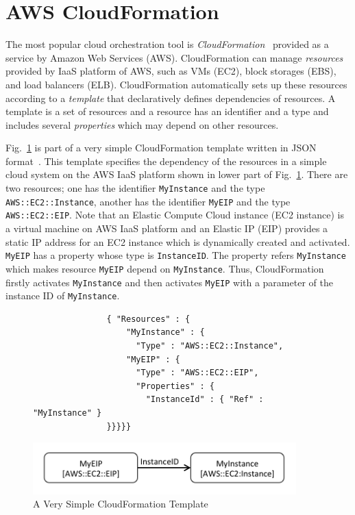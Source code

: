 \documentclass[12pt]{report}
\begin{document}
\section{AWS CloudFormation}
\label{sec:aws}
The most popular cloud orchestration tool is {\it
  CloudFormation}~\cite{CloudFormation} provided as a service by
Amazon Web Services (AWS). CloudFormation can manage {\it resources}
provided by IaaS platform of AWS, such as VMs (EC2), block storages
(EBS), and load balancers (ELB).  CloudFormation automatically sets up
these resources according to a {\it template} that declaratively
defines dependencies of resources.  A template is a set of resources
and a resource has an identifier and a type and includes several {\it
  properties} which may depend on other resources.

Fig.~\ref{fig:AWSExample} is part of a very simple CloudFormation
template written in JSON format~\cite{JSON}.  This template specifies
the dependency of the resources in a simple cloud system on the AWS
IaaS platform shown in lower part of Fig.~\ref{fig:AWSExample}.  There are two
resources; one has the identifier {\tt MyInstance} and the type {\tt
  AWS::EC2::Instance}, another has the identifier {\tt MyEIP} and the
type {\tt AWS::EC2::EIP}. Note that an Elastic Compute Cloud instance
(EC2 instance) is a virtual machine on AWS IaaS platform and an
Elastic IP (EIP) provides a static IP address for an EC2 instance
which is dynamically created and activated. {\tt MyEIP} has a property
whose type is {\tt InstanceID}. The property refers {\tt MyInstance}
which makes resource {\tt MyEIP} depend on {\tt MyInstance}. Thus,
CloudFormation firstly activates {\tt MyInstance} and then activates
{\tt MyEIP} with a parameter of the instance ID of {\tt MyInstance}.
\begin{figure}
\small
\begin{verbatim}
               { "Resources" : {
                   "MyInstance" : {
                     "Type" : "AWS::EC2::Instance",
                   "MyEIP" : {
                     "Type" : "AWS::EC2::EIP",
                     "Properties" : {
                       "InstanceId" : { "Ref" : "MyInstance" }
               }}}}}
\end{verbatim}
\normalsize
\centering
\includegraphics[height=2cm,natwidth=396,natheight=78]{./exaws.png}
\vspace{-0.3cm}
\caption{A Very Simple CloudFormation Template}
\label{fig:AWSExample}
\end{figure}
\end{document}

